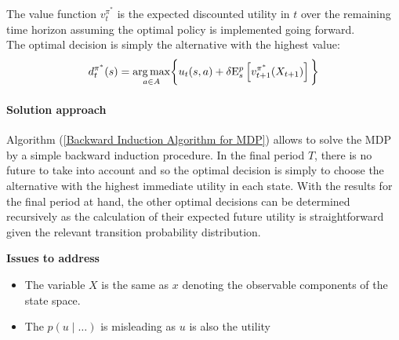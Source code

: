 The value function $v^{\pi^*}_t$ is the expected discounted utility in $t$ over the remaining time horizon assuming the optimal policy is implemented going forward.\\

The optimal decision is simply the alternative with the highest value:
%
\begin{align*}
d^{\pi^*}_t(s) = \underset{a\in A}{\operatorname*{arg\,max}} \bigg\{ u_t(s, a) + \delta\mathrm{E}^p_{s} \left[v^{\pi^*}_{t + 1}(X_{t + 1})\right] \bigg\}
\end{align*}

\paragraph{Solution approach} Algorithm (\ref{Backward Induction Algorithm for MDP}) allows to solve the MDP by a simple backward induction procedure. In the final period $T$, there is no future to take into account and so the optimal decision is simply to choose the alternative with the highest immediate utility in each state. With the results for the final period at hand, the other optimal decisions can be determined recursively as the calculation of their expected future utility is straightforward given the relevant transition probability distribution.

\vspace{0.5cm}

\textbf{Issues to address}

\begin{itemize}
  \item The variable $X$ is the same as $x$ denoting the observable components of the state space.
  \item The $p(u\mid\hdots)$ is misleading as $u$ is also the utility
\end{itemize}
